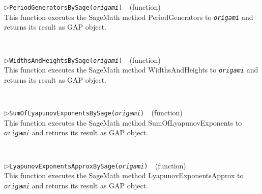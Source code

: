 \documentclass[a4paper,11pt]{report}
\begin{document}
{{{\begin{Verbatim}[commandchars=!@|,fontsize=\small,frame=single,label=Example]
\end{Verbatim}
 \noindent\textcolor{FuncColor}{$\triangleright$\enspace\texttt{PeriodGeneratorsBySage({\mdseries\slshape origami})
\label{PeriodGeneratorsBySage}
}\hfill{\scriptsize (function)}}\\


 This function executes the SageMath method PeriodGenerators to \mbox{\texttt{\mdseries\slshape origami}} and returns its result as \textsf{GAP} object. 
\begin{Verbatim}[commandchars=!@|,fontsize=\small,frame=single,label=Example]
  
\end{Verbatim}
 \noindent\textcolor{FuncColor}{$\triangleright$\enspace\texttt{WidthsAndHeightsBySage({\mdseries\slshape origami})
\label{WidthsAndHeightsBySage}
}\hfill{\scriptsize (function)}}\\


 This function executes the SageMath method WidthsAndHeights to \mbox{\texttt{\mdseries\slshape origami}} and returns its result as \textsf{GAP} object. 
\begin{Verbatim}[commandchars=!@|,fontsize=\small,frame=single,label=Example]
  
\end{Verbatim}
 \noindent\textcolor{FuncColor}{$\triangleright$\enspace\texttt{SumOfLyapunovExponentsBySage({\mdseries\slshape origami})
\label{SumOfLyapunovExponentsBySage}
}\hfill{\scriptsize (function)}}\\


 This function executes the SageMath method SumOfLyapunovExponents to \mbox{\texttt{\mdseries\slshape origami}} and returns its result as \textsf{GAP} object. 
\begin{Verbatim}[commandchars=!@|,fontsize=\small,frame=single,label=Example]
  
\end{Verbatim}
 \noindent\textcolor{FuncColor}{$\triangleright$\enspace\texttt{LyapunovExponentsApproxBySage({\mdseries\slshape origami})
\label{LyapunovExponentsApproxBySage}
}\hfill{\scriptsize (function)}}\\


 This function executes the SageMath method LyapunovExponentsApprox to \mbox{\texttt{\mdseries\slshape origami}} and returns its result as \textsf{GAP} object. 
\begin{Verbatim}[commandchars=!@|,fontsize=\small,frame=single,label=Example]
  

\end{Verbatim}}}}
\end{document}
